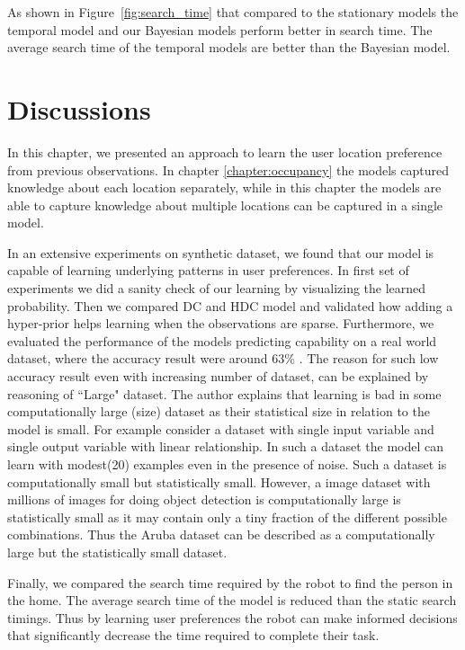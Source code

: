 As shown in Figure~\ref{fig:search_time} that compared to the stationary models the temporal model and our Bayesian models perform better in search time. The average search time of the temporal models are better than the Bayesian model.

\section{Discussions}
In this chapter, we presented an approach to learn the user location preference from previous observations.  In chapter \ref{chapter:occupancy} the models captured knowledge about each location separately, while in this chapter the models are able to capture knowledge about multiple locations can be captured in a single model. 

In an extensive experiments on synthetic dataset, we found that our model is capable of learning underlying patterns in user preferences. In first set of experiments we did a sanity check of our learning by visualizing the learned probability. Then we compared DC and HDC model and validated how adding a hyper-prior helps learning when the observations are sparse. Furthermore, we evaluated the performance of the models predicting capability on a real world dataset, where the accuracy result were around 63\% . The reason for such low accuracy result even with increasing number of dataset, can be explained by \cite{Bishop20120222} reasoning of ``Large" dataset. The author explains that learning is bad in some computationally large (size) dataset as their statistical size in relation to the model is small. For example consider a dataset with single input variable and single output variable with linear relationship. In such a dataset the model can learn with modest(20) examples even in the presence of noise. Such a dataset is computationally small but statistically small. However, a image dataset with millions of images for doing object detection is computationally large is statistically small as it may contain only a tiny fraction of the different possible combinations. Thus the Aruba dataset can be described as a computationally large but the statistically small dataset.

Finally, we compared the search time required by the robot to find the person in the home. The average search time of the model is reduced than the static search timings. Thus by learning user preferences the robot can make informed decisions that significantly decrease the time required to complete their task.






